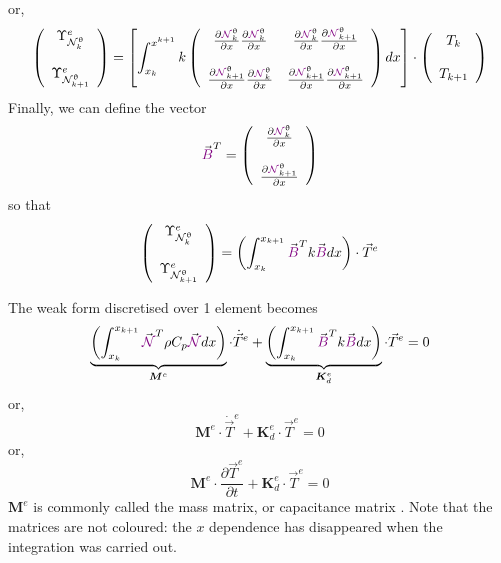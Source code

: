or,
\[
\left(
\begin{array}{cc}
{\Upsilon}_{{\mathcal{N}}_k^\uptheta}^e \\ \\ 
{\Upsilon}_{{\mathcal{N}}_{k+1}^\uptheta}^e
\end{array}
\right)
=
\left[
\int_{x_k}^{x^{k+1}}
k
\left(
\begin{array}{cc}
\frac{\partial {\color{violet}{\mathcal{N}}}_k^\uptheta}{\partial x}  \frac{\partial  
{\color{violet}{\mathcal{N}}}_{k}^\uptheta } {\partial x}   & 
\frac{\partial {\color{violet}{\mathcal{N}}}_k^\uptheta}{\partial x}  \frac{\partial  
{\color{violet}{\mathcal{N}}}_{k+1}^\uptheta } {\partial x}  
\\ \\
\frac{\partial {\color{violet}{\mathcal{N}}}_{k+1}^\uptheta}{\partial x}  \frac{\partial  
{\color{violet}{\mathcal{N}}}_{k}^\uptheta } {\partial x}   & 
\frac{\partial {\color{violet}{\mathcal{N}}}_{k+1}^\uptheta}{\partial x}  \frac{\partial  
{\color{violet}{\mathcal{N}}}_{k+1}^\uptheta } {\partial x}  
\end{array}
\right)
dx
\right]
\cdot
\left(
\begin{array}{c}
T_k \\ \\ T_{k+1}
\end{array}
\right)
\]
Finally, we can define the vector 
\[
{\vec {\color{violet}B}}^T=
\left(
\begin{array}{cc}
\frac{\partial {\color{violet}{\mathcal{N}}}_k^\uptheta}{\partial x}   \\ \\
\frac{\partial {\color{violet}{\mathcal{N}}}_{k+1}^\uptheta}{\partial x}
\end{array}
\right)
\]
so that 
\[
\left(
\begin{array}{cc}
{\Upsilon}_{{\mathcal{N}}_k^\uptheta}^e \\ \\ 
{\Upsilon}_{{\mathcal{N}}_{k+1}^\uptheta}^e
\end{array}
\right)
=
\left( \int_{x_k}^{x_{k+1}}   {\vec {\color{violet}B}}^T 
k {\vec {\color{violet}B}} dx  \right) \cdot {\vec T}^e
\]

The weak form discretised over 1 element becomes
\[
\underbrace{\left( \int_{x_k}^{x_{k+1}}   {\vec {\color{violet}{\mathcal{N}}}}^T 
\rho C_p {\vec {\color{violet}{\mathcal{N}}}} dx  \right) }_{\bm M^e} \cdot \dot{\vec T}^e
+
\underbrace{\left( \int_{x_k}^{x_{k+1}}   {\vec {\color{violet}B}}^T k 
{\vec {\color{violet}B}} dx  \right)}_{{\bm K}_d^e} \cdot {\vec T}^e
=0
\]
or,
\[
\boxed{
{\bm M}^e \cdot \dot{\vec T}^e + {\bm K}_d^e \cdot {\vec T}^e = 0
}
\]
or,
\[
\boxed{
{\bm M}^e \cdot \frac{\partial {\vec T}^e}{\partial t} + {\bm K}_d^e \cdot {\vec T}^e = 0
}
\]
${\bm M}^e$ is commonly called the {\color{olive}mass matrix}, or capacitance matrix \cite[p103]{reddybook2}.
Note that the matrices are not coloured: the $x$ dependence has disappeared when 
the integration was carried out.



